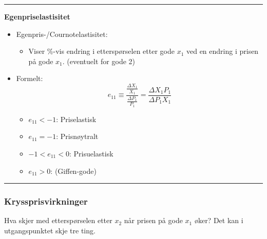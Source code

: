 \documentclass[
  letterpaper,
  DIV=11,
  numbers=noendperiod]{scrartcl}
\providecommand{\tightlist}{%
  \setlength{\itemsep}{0pt}\setlength{\parskip}{0pt}}\usepackage{longtable,booktabs,array}
\begin{document}
\begin{center}\rule{0.5\linewidth}{0.5pt}\end{center}

\textbf{Egenpriselastisitet}

\begin{itemize}
\tightlist
\item
  Egenpris-/Cournotelastisitet:

  \begin{itemize}
  \tightlist
  \item
    Viser \%-vis endring i etterspørselen etter gode \(x_1\) ved en
    endring i prisen på gode \(x_1\). (eventuelt for gode 2)
  \end{itemize}
\item
  Formelt: \begin{equation*}
  e_{11} \equiv \frac{\frac{\Delta X_{1}}{X_{1}}}{\frac{\Delta P_{1}}{P_{1}}}=\frac{\Delta X_{1} P_{1} }{\Delta P_{1} X_{1}}
  \end{equation*}

  \begin{itemize}
  \tightlist
  \item
    \(e_{11} < -1\): Priselastisk
  \item
    \(e_{11} = -1\): Prisnøytralt
  \item
    \(-1< e_{11}< 0\): Prisuelastisk
  \item
    \(e_{11} > 0\): (Giffen-gode)
  \end{itemize}
\end{itemize}

\begin{center}\rule{0.5\linewidth}{0.5pt}\end{center}

\subsubsection{Kryssprisvirkninger}\label{kryssprisvirkninger}

Hva skjer med etterspørselen etter \(x_2\) når prisen på gode \(x_1\)
øker? Det kan i utgangspunktet skje tre ting.
\end{document}
